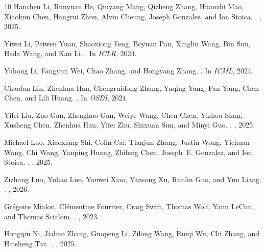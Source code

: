 \begin{thebibliography}{10}
Hanchen Li, Runyuan He, Qiuyang Mang, Qizheng Zhang, Huanzhi Mao, Xiaokun Chen,
  Hangrui Zhou, Alvin Cheung, Joseph Gonzalez, and Ion Stoica.
.
, 2025.

Yiwei Li, Peiwen Yuan, Shaoxiong Feng, Boyuan Pan, Xinglin Wang, Bin Sun,
  Heda Wang, and Kan Li.
.
\newblock In {\em ICLR}, 2024.

Yuhong Li, Fangyun Wei, Chao Zhang, and Hongyang Zhang.
.
\newblock In {\em ICML}, 2024.

Chaofan Lin, Zhenhua Han, Chengruidong Zhang, Yuqing Yang, Fan Yang, Chen Chen,
  and Lili Huang.
.
\newblock In {\em OSDI}, 2024.

Yifei Liu, Zuo Gan, Zhenghao Gan, Weiye Wang, Chen Chen, Yizhou Shan, Xusheng
  Chen, Zhenhua Han, Yifei Zhu, Shixuan Sun, and Minyi Guo.
.
, 2025.

Michael Luo, Xiaoxiang Shi, Colin Cai, Tianjun Zhang, Justin Wong, Yichuan
  Wang, Chi Wang, Yanping Huang, Zhifeng Chen, Joseph~E. Gonzalez, and Ion
  Stoica.
.
, 2025.

Zizhang Luo, Yuhao Luo, Youwei Xiao, Yansong Xu, Runlin Guo, and Yun Liang.
.
, 2026.

Gr{\'e}goire Mialon, Cl{\'e}mentine Fourrier, Craig Swift, Thomas Wolf, Yann
  LeCun, and Thomas Scialom.
.
, 2023.

Hongqiu Ni, Jiabao Zhang, Guopeng Li, Zilong Wang, Ruiqi Wu, Chi Zhang, and
  Haisheng Tan.
.
, 2025.


\end{thebibliography}
